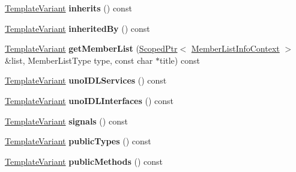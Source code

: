 \begin{DoxyCompactItemize}
\item 
\hypertarget{class_class_context_1_1_private_a283866dc009a42ecba225be12ad83e95}{\hyperlink{class_template_variant}{Template\-Variant} {\bfseries inherits} () const }\label{class_class_context_1_1_private_a283866dc009a42ecba225be12ad83e95}

\item 
\hypertarget{class_class_context_1_1_private_ae8690ebb44e11584000a860c86e3c33d}{\hyperlink{class_template_variant}{Template\-Variant} {\bfseries inherited\-By} () const }\label{class_class_context_1_1_private_ae8690ebb44e11584000a860c86e3c33d}

\item 
\hypertarget{class_class_context_1_1_private_a2e63116274e08d4af8c62c8bb53b6f1f}{\hyperlink{class_template_variant}{Template\-Variant} {\bfseries get\-Member\-List} (\hyperlink{class_scoped_ptr}{Scoped\-Ptr}$<$ \hyperlink{class_member_list_info_context}{Member\-List\-Info\-Context} $>$ \&list, Member\-List\-Type type, const char $\ast$title) const }\label{class_class_context_1_1_private_a2e63116274e08d4af8c62c8bb53b6f1f}

\item 
\hypertarget{class_class_context_1_1_private_a991c36801329b98ae7c08061caa1a9aa}{\hyperlink{class_template_variant}{Template\-Variant} {\bfseries uno\-I\-D\-L\-Services} () const }\label{class_class_context_1_1_private_a991c36801329b98ae7c08061caa1a9aa}

\item 
\hypertarget{class_class_context_1_1_private_a6355032c24759d6069a31b1141098a39}{\hyperlink{class_template_variant}{Template\-Variant} {\bfseries uno\-I\-D\-L\-Interfaces} () const }\label{class_class_context_1_1_private_a6355032c24759d6069a31b1141098a39}

\item 
\hypertarget{class_class_context_1_1_private_a90512e625c09836be07769a03d707f54}{\hyperlink{class_template_variant}{Template\-Variant} {\bfseries signals} () const }\label{class_class_context_1_1_private_a90512e625c09836be07769a03d707f54}

\item 
\hypertarget{class_class_context_1_1_private_a8b823a49382a79790999b014d897129d}{\hyperlink{class_template_variant}{Template\-Variant} {\bfseries public\-Types} () const }\label{class_class_context_1_1_private_a8b823a49382a79790999b014d897129d}

\item 
\hypertarget{class_class_context_1_1_private_a75901b1945b4bf6949c594dd311cb487}{\hyperlink{class_template_variant}{Template\-Variant} {\bfseries public\-Methods} () const }\label{class_class_context_1_1_private_a75901b1945b4bf6949c594dd311cb487}


\end{DoxyCompactItemize}
